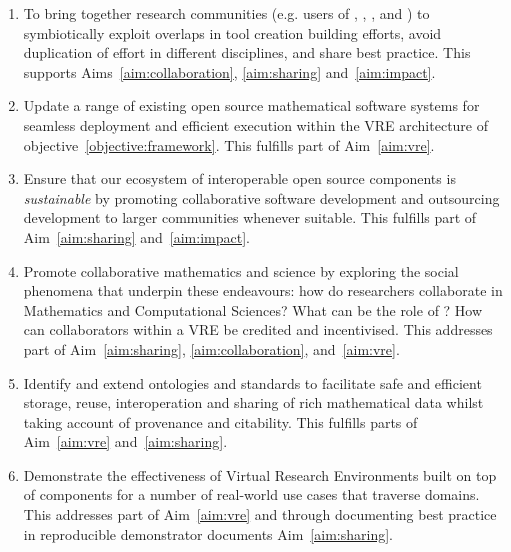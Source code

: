 \documentclass[noworkareas,deliverables,\classoptions]{euproposal}       %
\begin{document}
\begin{proposal}
\begin{enumerate}
\item \label{objective:community} To bring together research
  communities (e.g. users of \Jupyter, \Sage, \Singular, and \GAP) to
  symbiotically exploit overlaps in tool creation building efforts,
  avoid duplication of effort in different disciplines, and share best
  practice. This supports Aims~\ref{aim:collaboration},
  \ref{aim:sharing} and~\ref{aim:impact}.

\item \label{objective:updates} Update a range of existing open source
  mathematical software systems for seamless deployment and efficient
  execution within the VRE architecture of objective~\ref{objective:framework}.
  This fulfills part of Aim~\ref{aim:vre}.



\item \label{objective:sustainable} Ensure that our ecosystem of
  interoperable open source components is \emph{sustainable} by
  promoting collaborative software development and outsourcing
  development to larger communities whenever suitable. This fulfills
  part of Aim~\ref{aim:sharing} and~\ref{aim:impact}.

\item \label{objective:social} Promote collaborative mathematics and
  science by exploring the social phenomena that underpin these
  endeavours: how do researchers collaborate in Mathematics and
  Computational Sciences?  What can be the role of \VREs?  How can
  collaborators within a VRE be credited and incentivised. This
  addresses part of Aim~\ref{aim:sharing}, \ref{aim:collaboration},
  and~\ref{aim:vre}.

\item \label{objective:data} Identify and extend ontologies and
  standards to facilitate safe and efficient storage, reuse,
  interoperation and sharing of rich mathematical data whilst taking
  account of provenance and citability. This fulfills parts of
  Aim~\ref{aim:vre} and~\ref{aim:sharing}.

\item \label{objective:demo} Demonstrate the effectiveness of Virtual
  Research Environments built on top of \TheProject components for a
  number of real-world use cases that traverse domains. This addresses
  part of Aim~\ref{aim:vre} and through documenting best practice in
  reproducible demonstrator documents Aim~\ref{aim:sharing}.


\end{enumerate}
\end{proposal}
\end{document}
